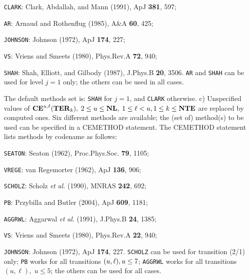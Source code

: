 {\tt CLARK}: \quad Clark, Abdallah, and Mann (1991), ApJ {\bf 381}, 597;

{\tt AR}: \quad Arnaud and Rothenflug (1985), A\&A {\bf 60}, 425;

{\tt JOHNSON}: \quad Johnson (1972), ApJ {\bf 174}, 227;

{\tt VS}: \quad Vriens and Smeets (1980), Phys.Rev.A {\bf 72}, 940;

{\tt SHAH}: \quad Shah, Elliott, and Gilbody (1987), J.Phys.B {\bf 20}, 3506. \np
{\tt AR} and {\tt SHAH} can be used for level $j = 1$ only; the others
can be used in all cases.

The default methods set is: {\tt SHAH} for $j = 1$, and {\tt CLARK} otherwise.
\blankline
c) Unspecified values of
${\bf CE}^{u,\ell}({\bf TER}_k), \; 2 \leq u \leq {\bf NL}, \;
1 \leq \ell < u, \break 1 \leq k \leq {\bf NTE}$ are replaced by computed ones.
Six different methods are available; the (set of) method(s) to be used can be
specified in a CEMETHOD statement. The CEMETHOD statement lists
methods by codename as follows:

{\tt SEATON}: \quad Seaton (1962), Proc.Phys.Soc. {\bf 79}, 1105;

{\tt VREGE}: \quad van Regemorter (1962), ApJ {\bf 136}, 906;

{\tt SCHOLZ}: \quad Scholz {\it et al.} (1990), MNRAS {\bf 242}, 692;

{\tt PB}: \quad Przybilla and Butler (2004), ApJ {\bf 609}, 1181; 

{\tt AGGRWL}: \quad Aggarwal {\it et al.} (1991), J.Phys.B {\bf 24}, 1385;

{\tt VS}: \quad Vriens and Smeets (1980), Phys.Rev.A {\bf 22}, 940;

{\tt JOHNSON}: \quad Johnson (1972), ApJ {\bf 174}, 227. \np
{\tt SCHOLZ} can be used for transition (2/1) only;
{\tt PB} works for all transitions $(u,\ell), \break u \leq 7$;
{\tt AGGRWL} works for all transitions $(u,\ell), \; u \leq 5$;
the others can be used for all cases.

